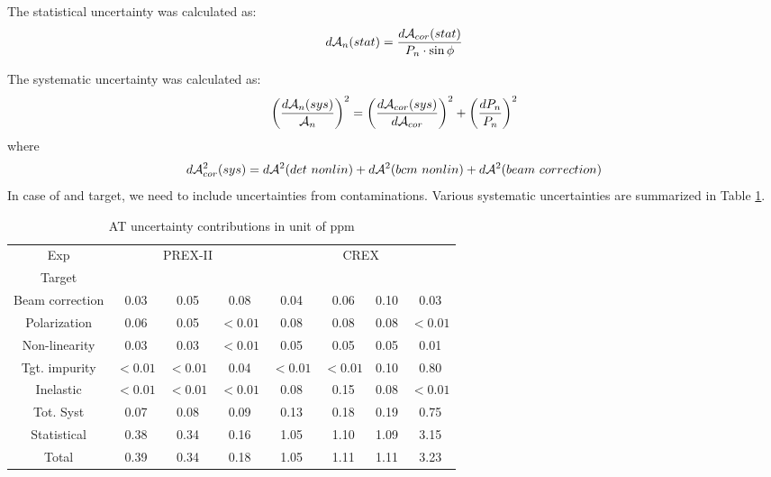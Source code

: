 The statistical uncertainty was calculated as:
\begin{equation}
    d\mathcal{A}_n(stat) = \frac{d\mathcal{A}_{cor}(stat)}{P_n \cdot \sin\phi}
\end{equation}

The systematic uncertainty was calculated as:
\begin{equation}
    \left( \frac{d\mathcal{A}_n(sys)}{\mathcal{A}_n} \right)^2 = 
	\left( \frac{d\mathcal{A}_{cor}(sys)}{d\mathcal{A}_{cor}} \right)^2
	+ \left( \frac{dP_n}{P_n}\right)^2 
\end{equation}
where
\begin{equation}
    d\mathcal{A}^2_{cor}(sys) = d\mathcal{A}^2(det\ nonlin) + d\mathcal{A}^2(bcm\ nonlin) + d\mathcal{A}^2(beam\ correction)
\end{equation}
In case of \Pb and \Ca target, we need to include uncertainties from contaminations.
Various systematic uncertainties are summarized in Table \ref{tab:AT_uncertainties}.
\begin{table}[!h]
    \centering
    \begin{tabular}{c c c c | c c c c}
	\hline
	Exp & \multicolumn{3}{c|}{PREX-II}  & \multicolumn{4}{c}{CREX}	\\
	Target	& \C	& \ca	& \Pb	& \C	& \ca	& \Ca	& \Pb	\\
	\hline
	Beam correction & 0.03  & 0.05  & 0.08  & 0.04  & 0.06  & 0.10  & 0.03	\\
	Polarization    & 0.06  & 0.05  & $<0.01$ & 0.08  & 0.08  & 0.08  & $<0.01$	\\
	Non-linearity   & 0.03  & 0.03  & $<0.01$ & 0.05  & 0.05  & 0.05  & 0.01	\\
	Tgt. impurity   & $<0.01$ & $<0.01$ & 0.04  & $<0.01$ & $<0.01$ & 0.10  & 0.80	\\
	Inelastic	& $<0.01$ & $<0.01$ & $<0.01$ & 0.08  & 0.15  & 0.08  & $<0.01$	\\
	\hline	
	Tot. Syst	& 0.07  & 0.08  & 0.09  & 0.13  & 0.18  & 0.19  & 0.75	\\
	Statistical	& 0.38  & 0.34  & 0.16  & 1.05  & 1.10  & 1.09  & 3.15	\\
	Total		& 0.39  & 0.34  & 0.18  & 1.05  & 1.11  & 1.11  & 3.23	\\
	\hline
    \end{tabular}
    \caption{AT uncertainty contributions in unit of ppm}
    \label{tab:AT_uncertainties}
\end{table}

